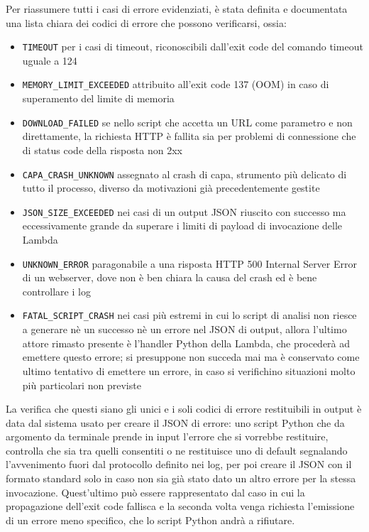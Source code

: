 Per riassumere tutti i casi di errore evidenziati,
è stata definita e documentata una lista chiara dei codici di errore che possono verificarsi, ossia:
\begin{itemize}
    \item \texttt{TIMEOUT} per i casi di timeout, riconoscibili dall'exit code del comando timeout uguale a 124
    \item \texttt{MEMORY\_LIMIT\_EXCEEDED} attribuito all'exit code 137 (OOM) in caso di superamento del limite di memoria
    \item \texttt{DOWNLOAD\_FAILED} se nello script che accetta un URL come parametro e non direttamente, la richiesta HTTP è fallita sia per problemi di connessione che di status code della risposta non 2xx
    \item \texttt{CAPA\_CRASH\_UNKNOWN} assegnato al crash di capa, strumento più delicato di tutto il processo, diverso da motivazioni già precedentemente gestite
    \item \texttt{JSON\_SIZE\_EXCEEDED} nei casi di un output JSON riuscito con successo ma eccessivamente grande da superare i limiti di payload di invocazione delle Lambda
    \item \texttt{UNKNOWN\_ERROR} paragonabile a una risposta HTTP 500 Internal Server Error di un webserver, dove non è ben chiara la causa del crash ed è bene controllare i log
    \item \texttt{FATAL\_SCRIPT\_CRASH} nei casi più estremi in cui lo script di analisi non riesce a generare nè un successo nè un errore nel JSON di output, allora l'ultimo attore rimasto presente è l'handler Python della Lambda, che procederà ad emettere questo errore; si presuppone non succeda mai ma è conservato come ultimo tentativo di emettere un errore, in caso si verifichino situazioni molto più particolari non previste
\end{itemize}

La verifica che questi siano gli unici e i soli codici di errore restituibili in output è data dal sistema usato per creare il JSON di errore: uno script Python che da argomento da terminale prende in input l'errore che si vorrebbe restituire, controlla che sia tra quelli consentiti o ne restituisce uno di default segnalando l'avvenimento fuori dal protocollo definito nei log, per poi creare il JSON con il formato standard solo in caso non sia già stato dato un altro errore per la stessa invocazione. Quest'ultimo può essere rappresentato dal caso in cui la propagazione dell'exit code fallisca e la seconda volta venga richiesta l'emissione di un errore meno specifico, che lo script Python andrà a rifiutare.

